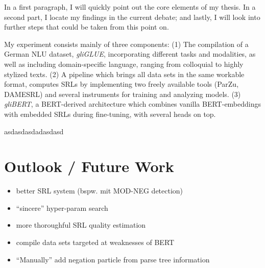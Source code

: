 \label{chap:6_conclusion}


In a first paragraph, I will quickly point out the core elements of my thesis. In a second part, I
locate my findings in the current debate; and lastly, I will look into further steps that could be
taken from this point on.


My experiment consists mainly of three components: (1) The compilation of a German NLU
dataset, \emph{gliGLUE}, incorporating different tasks and modalities, as well as
including domain-specific language, ranging from colloquial to highly stylized texts.
(2) A pipeline which brings all data sets in the same workable format, computes SRLs
by implementing two freely available tools (ParZu, DAMESRL) and several instruments
for training and analyzing models. (3) \emph{gliBERT}, a BERT-derived architecture
which combines vanilla BERT-embeddings with embedded SRLs during fine-tuning, with
several heads on top.

asdasdasdadasdasd



\section{Outlook / Future Work}



\begin{itemize}
  \item better SRL system (bspw. mit MOD-NEG detection)
  \item ``sincere'' hyper-param search
  \item more thoroughful SRL quality estimation
  \item compile data sets targeted at weaknesses of BERT
  \item ``Manually'' add negation particle from parse tree information
\end{itemize}


